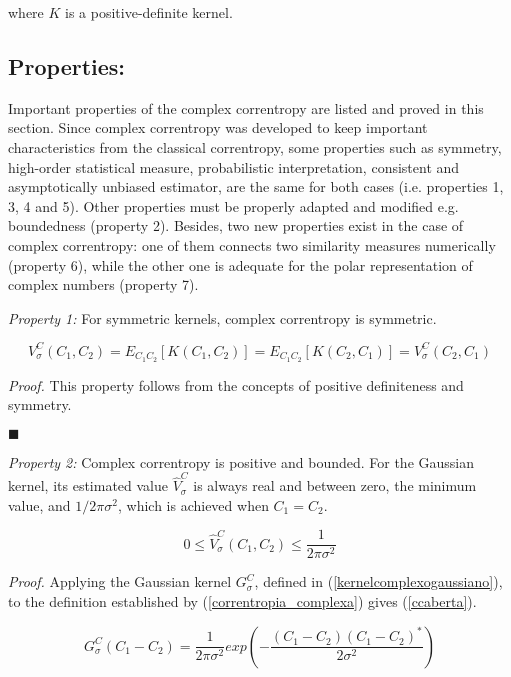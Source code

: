 \documentclass[preprint,12pt]{elsarticle}
\begin{document}
where $K$ is a positive-definite kernel.



\subsection{Properties:}

Important properties of the complex correntropy are listed and proved in this section. Since complex correntropy was developed to keep important characteristics from the classical correntropy, some properties such as symmetry, high-order statistical measure, probabilistic interpretation,  consistent and asymptotically unbiased estimator, are the same for both cases (i.e. properties 1, 3, 4 and 5). Other properties must be properly adapted and modified e.g. boundedness (property 2). Besides, two new properties exist in the case of complex correntropy: one of them connects two similarity measures numerically (property 6), while the other one is adequate for the polar representation of complex numbers (property 7). 




\bigskip
\textit{Property 1:} For symmetric kernels, complex correntropy is symmetric.


\begin{equation}
V^{C}_{\sigma}(C_{1},C_{2}) = E_{C_{1}C_{2}}[ K (C_{1}, C_{2}) ]  = E_{C_{1}C_{2}}[ K(C_{2},C_{1}) ] = V^{C}_{\sigma}(C_{2},C_{1}) 
\end{equation}


\textit{Proof.} This property follows from the concepts of positive definiteness and symmetry. 
\begin{flushright}
$\blacksquare$
\end{flushright}


\bigskip
\textit{Property 2:} Complex correntropy is positive and bounded. For the Gaussian kernel, its estimated value $\hat{V}^C_{\sigma}$ is always real and between zero, the minimum value, and  $1 / 2\pi\sigma^2 $, which is achieved when $C_1 = C_2$.


\begin{equation}
0 \leq \hat{V}^{C}_{\sigma}(C_{1},C_{2}) \leq \frac{1}{2\pi\sigma^2}
\end{equation}


\textit{Proof.} Applying the Gaussian kernel $G^{C}_{\sigma}$, defined in (\ref{kernelcomplexogaussiano}), to the definition established by (\ref{correntropia_complexa}) gives (\ref{ccaberta}).

 
\begin{equation}\label{kernelcomplexogaussiano}
G^{C}_{\sigma} (C_1 - C_2 )= \frac{1}{2\pi\sigma^2}exp \left ( -\frac{(C_{1} - C_{2}) (C_{1} - C_{2})^{*}}{2\sigma^2} \right )
\end{equation}
\end{document}
